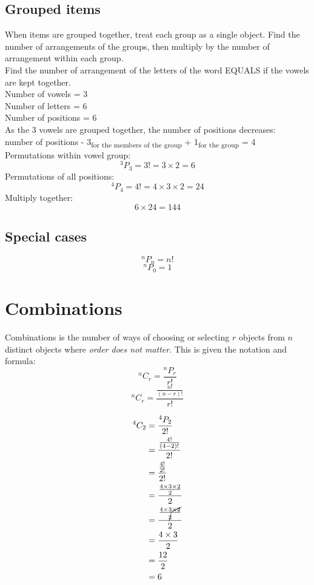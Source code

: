 \documentclass{book}
\begin{document}
\section{Grouped items}
When items are grouped together, treat each group as a single object.  Find the number of arrangements of the groups, then multiply by the number of arrangement within each group.\\

Find the number of arrangement of the letters of the word EQUALS if the vowels are kept together.\\
Number of vowels = 3\\
Number of letters = 6\\
Number of positions = 6\\
As the 3 vowels are grouped together, the number of positions decreases:\\ number of positions - 3\textsubscript{for the members of the group} + 1\textsubscript{for the group} = 4\\
Permutations within vowel group:
\[^3P_3 = 3! = 3 \times 2 = 6\]
Permutations of all positions:
\[^4P_4 = 4! = 4 \times 3 \times 2 = 24\]
Multiply together:
\[6 \times 24 = 144\]

\section{Special cases}
\[^nP_n = n!\]
\[^nP_0 = 1\]

\chapter{Combinations}
Combinations is the number of ways of choosing or selecting $r$ objects from $n$ distinct objects where \emph{order does not matter}.  This is given the notation and formula:
\[^nC_r = \frac{^nP_r}{r!}\]
\[^nC_r = \frac{\frac{n!}{(n-r)!}}{r!}\]

\begin{align*}
	^4C_2 & = \frac{^4P_2}{2!}                                          \\
	      & = \frac{\frac{4!}{(4 - 2)!}}{2!}                            \\
	      & = \frac{\frac{4!}{2!}}{2!}                                  \\
	      & = \frac{\frac{4 \times 3 \times 2}{2}}{2}                   \\
	      & = \frac{\frac{4 \times 3 \cancel{\times 2}}{\cancel{2}}}{2} \\
	      & = \frac{4 \times 3}{2}                                      \\
	      & = \frac{12}{2}                                              \\
	      & = 6                                                         \\
\end{align*}
\end{document}

